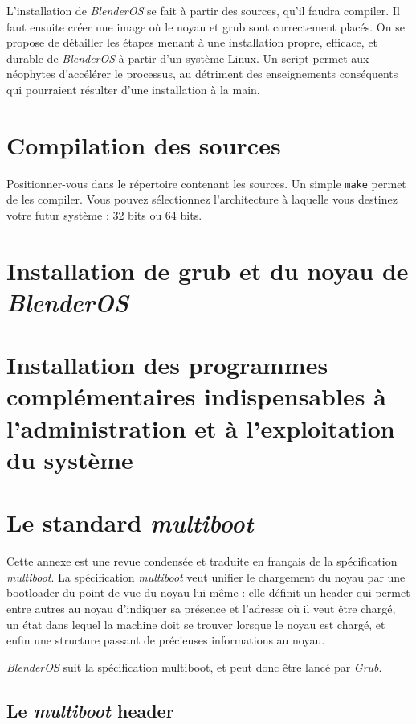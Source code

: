 \documentclass{article}
\begin{document}
L'installation de \emph{BlenderOS} se fait à partir des sources, qu'il faudra compiler. Il faut ensuite créer une image où le noyau et grub sont correctement placés. On se propose de détailler les étapes menant à une installation propre, efficace, et durable de \emph{BlenderOS} à partir d'un système Linux. Un script permet aux néophytes d'accélérer le processus, au détriment des enseignements conséquents qui pourraient résulter d'une installation à la main.

\section{Compilation des sources}

  Positionner-vous dans le répertoire contenant les sources. Un simple \verb|make| permet de les compiler. Vous pouvez sélectionnez l'architecture à laquelle vous destinez votre futur système : 32 bits ou 64 bits.
  
\section{Installation de grub et du noyau de \emph{BlenderOS}}

\section{Installation des programmes complémentaires indispensables à l'administration et à l'exploitation du système}

\appendix

\section{Le standard \emph{multiboot}}
Cette annexe est une revue condensée et traduite en français de la spécification \emph{multiboot}.
 La spécification \emph{multiboot} veut unifier le chargement du noyau par une bootloader du point de vue du noyau lui-même : elle définit un header qui permet entre autres au noyau d'indiquer sa présence et l'adresse où il veut être chargé, un état dans lequel la machine doit se trouver lorsque le noyau est chargé, et enfin une structure passant de précieuses informations au noyau.
 
 \emph{BlenderOS} suit la spécification multiboot, et peut donc être lancé par \emph{Grub}.
 
\subsection{Le \emph{multiboot} header}
\end{document}
